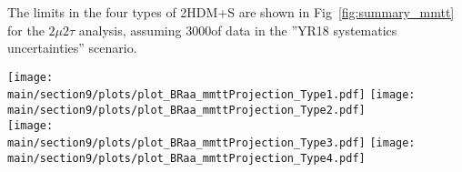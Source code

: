 The limits in the four types of 2HDM+S are shown
in Fig~\ref{fig:summary_mmtt} for the $2\mu 2\tau$ analysis, assuming 3000\fbinv of data in the ''YR18 systematics uncertainties'' scenario.

\begin{figure*}[hbpt]
\centering
        \texttt{[image: \\main/section9/plots/plot\_BRaa\_mmttProjection\_Type1.pdf]}
        \texttt{[image: \\main/section9/plots/plot\_BRaa\_mmttProjection\_Type2.pdf]} \\
        \texttt{[image: \\main/section9/plots/plot\_BRaa\_mmttProjection\_Type3.pdf]}
        \texttt{[image: \\main/section9/plots/plot\_BRaa\_mmttProjection\_Type4.pdf]}
    \caption{Expected upper limits on $(\sigma(h)/\sigma_{\textrm{SM}})\mathcal{B}(h\to aa)$ for 3000\fbinv of data with YR18 systematic uncertainties for the $2\mu 2\tau$ final state in 2HDM+S type-1 (top left), type-2 (top right), type-3 (bottom left), and type-4 (bottom right).}
    \label{fig:summary_mmtt}
\end{figure*}


